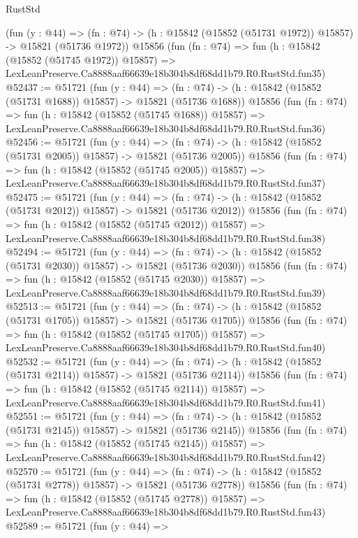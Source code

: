 \begin{lexlean}{RustStd}
\begin{coremodule}
    (fun (y : @44) =>
    (fn : @74) -> (h : @15842 (@15852 (@51731 @1972)) @15857) -> @15821 (@51736 @1972))
    @15856
    (fun (fn : @74) =>
    fun (h : @15842 (@15852 (@51745 @1972)) @15857) =>
    LexLeanPreserve.Ca8888aaf66639e18b304b8df68dd1b79.R0.RustStd.fun35)
@52437 := @51721
    (fun (y : @44) =>
    (fn : @74) -> (h : @15842 (@15852 (@51731 @1688)) @15857) -> @15821 (@51736 @1688))
    @15856
    (fun (fn : @74) =>
    fun (h : @15842 (@15852 (@51745 @1688)) @15857) =>
    LexLeanPreserve.Ca8888aaf66639e18b304b8df68dd1b79.R0.RustStd.fun36)
@52456 := @51721
    (fun (y : @44) =>
    (fn : @74) -> (h : @15842 (@15852 (@51731 @2005)) @15857) -> @15821 (@51736 @2005))
    @15856
    (fun (fn : @74) =>
    fun (h : @15842 (@15852 (@51745 @2005)) @15857) =>
    LexLeanPreserve.Ca8888aaf66639e18b304b8df68dd1b79.R0.RustStd.fun37)
@52475 := @51721
    (fun (y : @44) =>
    (fn : @74) -> (h : @15842 (@15852 (@51731 @2012)) @15857) -> @15821 (@51736 @2012))
    @15856
    (fun (fn : @74) =>
    fun (h : @15842 (@15852 (@51745 @2012)) @15857) =>
    LexLeanPreserve.Ca8888aaf66639e18b304b8df68dd1b79.R0.RustStd.fun38)
@52494 := @51721
    (fun (y : @44) =>
    (fn : @74) -> (h : @15842 (@15852 (@51731 @2030)) @15857) -> @15821 (@51736 @2030))
    @15856
    (fun (fn : @74) =>
    fun (h : @15842 (@15852 (@51745 @2030)) @15857) =>
    LexLeanPreserve.Ca8888aaf66639e18b304b8df68dd1b79.R0.RustStd.fun39)
@52513 := @51721
    (fun (y : @44) =>
    (fn : @74) -> (h : @15842 (@15852 (@51731 @1705)) @15857) -> @15821 (@51736 @1705))
    @15856
    (fun (fn : @74) =>
    fun (h : @15842 (@15852 (@51745 @1705)) @15857) =>
    LexLeanPreserve.Ca8888aaf66639e18b304b8df68dd1b79.R0.RustStd.fun40)
@52532 := @51721
    (fun (y : @44) =>
    (fn : @74) -> (h : @15842 (@15852 (@51731 @2114)) @15857) -> @15821 (@51736 @2114))
    @15856
    (fun (fn : @74) =>
    fun (h : @15842 (@15852 (@51745 @2114)) @15857) =>
    LexLeanPreserve.Ca8888aaf66639e18b304b8df68dd1b79.R0.RustStd.fun41)
@52551 := @51721
    (fun (y : @44) =>
    (fn : @74) -> (h : @15842 (@15852 (@51731 @2145)) @15857) -> @15821 (@51736 @2145))
    @15856
    (fun (fn : @74) =>
    fun (h : @15842 (@15852 (@51745 @2145)) @15857) =>
    LexLeanPreserve.Ca8888aaf66639e18b304b8df68dd1b79.R0.RustStd.fun42)
@52570 := @51721
    (fun (y : @44) =>
    (fn : @74) -> (h : @15842 (@15852 (@51731 @2778)) @15857) -> @15821 (@51736 @2778))
    @15856
    (fun (fn : @74) =>
    fun (h : @15842 (@15852 (@51745 @2778)) @15857) =>
    LexLeanPreserve.Ca8888aaf66639e18b304b8df68dd1b79.R0.RustStd.fun43)
@52589 := @51721
    (fun (y : @44) =>

\end{coremodule}
\end{lexlean}
